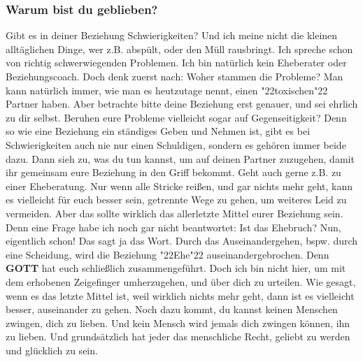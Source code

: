 \documentclass[10pt,a5paper]{article}
\newcommand{\Gott}[0]{\textbf{GOTT}}
\newcommand{\q}[1]{\char"22{#1}\char"22 }
\begin{document}
	\subsubsection{Warum bist du geblieben?}
		Gibt es in deiner Beziehung Schwierigkeiten?
		Und ich meine nicht die kleinen allt\"aglichen Dinge,
		wer z.B. absp\"ult,
		oder den M\"ull rausbringt.
		Ich spreche schon von richtig schwerwiegenden Problemen.
		Ich bin nat\"urlich kein Eheberater oder Beziehungscoach.
		Doch denk zuerst nach:
		Woher stammen die Probleme?
		Man kann nat\"urlich immer,
		wie man es heutzutage nennt,
		einen \q{toxischen} Partner haben.
		Aber betrachte bitte deine Beziehung erst genauer,
		und sei ehrlich zu dir selbst.
		Beruhen eure Probleme vielleicht sogar auf Gegenseitigkeit?
		Denn so wie eine Beziehung ein st\"andiges Geben und Nehmen ist,
		gibt es bei Schwierigkeiten auch nie nur einen Schuldigen,
		sondern es geh\"oren immer beide dazu.
		Dann sieh zu,
		was du tun kannst,
		um auf deinen Partner zuzugehen,
		damit ihr gemeinsam eure Beziehung in den Griff bekommt.
		Geht auch gerne z.B. zu einer Eheberatung.
		Nur wenn alle Stricke rei{\ss}en,
		und gar nichts mehr geht,
		kann es vielleicht f\"ur euch besser sein,
		getrennte Wege zu gehen,
		um weiteres Leid zu vermeiden.
		Aber das sollte wirklich das allerletzte Mittel eurer Beziehung sein.
		\\
		Denn eine Frage habe ich noch gar nicht beantwortet:
		Ist das Ehebruch?
		Nun, eigentlich schon!
		Das sagt ja das Wort.
		Durch das Auseinandergehen,
		bspw. durch eine Scheidung,
		wird die Beziehung \q{Ehe} auseinandergebrochen.
		Denn {\Gott} hat euch schlie{\ss}lich zusammengef\"uhrt.
		Doch ich bin nicht hier,
		um mit dem erhobenen Zeigefinger umherzugehen,
		und \"uber dich zu urteilen.
		Wie gesagt,
		wenn es das letzte Mittel ist,
		weil wirklich nichts mehr geht,
		dann ist es vielleicht besser,
		auseinander zu gehen.
		Noch dazu kommt,
		du kannst keinen Menschen zwingen,
		dich zu lieben.
		Und kein Mensch wird jemals dich zwingen k\"onnen,
		ihn zu lieben.
		Und grunds\"atzlich hat jeder das menschliche Recht,
		geliebt zu werden und gl\"ucklich zu sein.
		
\end{document}

